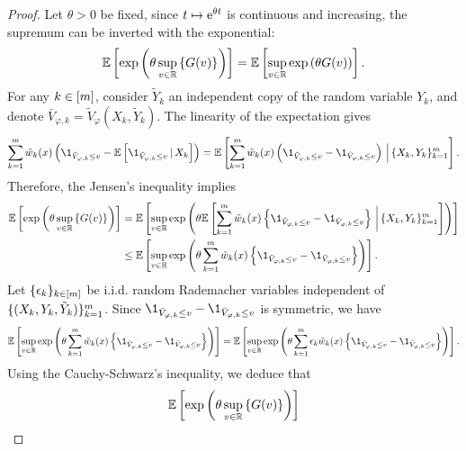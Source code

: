   \begin{proof}
    Let $\theta>0$ be fixed, since $t\mapsto \mathrm{e}^{\theta t}$ is continuous and increasing, the supremum can be inverted with the exponential:
    \begin{equation*}
        \mathbb{E}\left[{\exp\left({\theta \sup_{v \in \mathbb{R}}\left\{{G(v)}\right\}}\right)}\right]
        = \mathbb{E}\left[{\sup_{v \in \mathbb{R}} \exp\left({\theta G(v)}\right)}\right].
    \end{equation*}
    For any $k\in[m]$, consider $\tilde{Y}_{k}$ an independent copy of the random variable $Y_{k}$, and denote $\bar{V}_{\varphi,k}=\tilde{V}_{\varphi}(X_{k},\tilde{Y}_{k})$. The linearity of the expectation gives
    \begin{equation*}
        \sum_{k=1}^{\ccount} \tilde{w}_{k}(x) \pr{ \1_{\tilde{V}_{\varphi,k} \le v} - \E\br{\1_{\tilde{V}_{\varphi,k} \le v} \,\vert\, X_{k}} }
        = \E\br{\sum_{k=1}^{\ccount} \tilde{w}_{k}(x) \pr{ \1_{\tilde{V}_{\varphi,k} \le v} - \1_{\bar{V}_{\varphi,k} \le v} } \,\Big\vert\, \acn{X_{k}, Y_{k}}_{k=1}^{\ccount}}.
    \end{equation*}
    Therefore, the Jensen's inequality implies
    \begin{align*}
        \E\br{\exp\pr{\theta \sup_{v \in \R}\ac{G(v)}}}
        &= \E\br{\sup_{v \in \R} \exp\pr{\theta \E\br{\sum_{k=1}^{\ccount} \tilde{w}_{k}(x) \ac{ \1_{\tilde{V}_{\varphi,k} \le v} - \1_{\bar{V}_{\varphi,k} \le v}} \,\bigg\vert\, \acn{X_{k}, Y_{k}}_{k=1}^{\ccount}}}}
        \\
        &\le \E\br{\sup_{v \in \R} \exp\pr{\theta \sum_{k=1}^{\ccount} \tilde{w}_{k}(x) \ac{ \1_{\tilde{V}_{\varphi,k} \le v} - \1_{\bar{V}_{\varphi,k} \le v}}}}.
    \end{align*}
    Let $\{\epsilon_{k}\}_{k\in[m]}$ be i.i.d. random Rademacher variables independent of $\{(X_{k}, Y_{k}, \tilde{Y}_{k})\}_{k=1}^{m}$. Since $\1_{\tilde{V}_{\varphi,k} \le v} - \1_{\bar{V}_{\varphi,k} \le v}$ is symmetric, we have
    \begin{equation*}
        \E\br{\sup_{v \in \R} \exp\pr{\theta \sum_{k=1}^{\ccount} \tilde{w}_{k}(x) \ac{ \1_{\tilde{V}_{\varphi,k} \le v} - \1_{\bar{V}_{\varphi,k} \le v}}}}
        = \E\br{\sup_{v \in \R} \exp\pr{\theta \sum_{k=1}^{\ccount} \epsilon_{k} \tilde{w}_{k}(x) \ac{ \1_{\tilde{V}_{\varphi,k} \le v} - \1_{\bar{V}_{\varphi,k} \le v}}}}.
    \end{equation*}
    Using the Cauchy-Schwarz's inequality, we deduce that
    \begin{equation*}
        \E\br{\exp \pr{\theta \sup_{v \in \R}\ac{G(v)}}} 

\end{equation*}
\end{proof}
